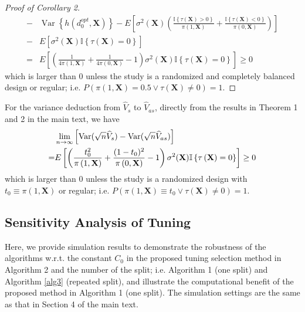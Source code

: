 \documentclass[11pt]{article}
\theoremstyle{referenceplain}
\theoremstyle{referencedefinition}
\theoremstyle{referenceremark}
\begin{document}
\begin{proof}[Proof of Corollary 2]
\begin{align*}
    -&\operatorname{Var}\left\{h\left(d_0^{o p t}, \mathbf{X}\right)\right\} - E\left[{\sigma^2(\mathbf{X})}\left(\frac{\mathbb{I}\left\{\tau\left(\mathbf{X}\right)>0\right\}}{\pi\left(1, \mathbf{X}\right)}+\frac{\mathbb{I}\left\{\tau\left(\mathbf{X}\right)<0\right\}}{\pi\left(0, \mathbf{X}\right)}\right)\right]\\
    -& E\left[{\sigma^2(\mathbf{X})} \mathbb{I}\left\{\tau\left(\mathbf{X}\right)=0\right\}\right]\\
   =&E\left[\left(\frac{1}{4 \pi\left(1, \mathbf{X}\right)}+\frac{1}{4\pi\left(0, \mathbf{X}\right)}-1\right){\sigma^2(\mathbf{X})} \mathbb{I}\left\{\tau\left(\mathbf{X}\right)=0\right\}\right]\ge 0
\end{align*}
which is larger than 0 unless the study is a randomized and completely balanced design or regular; i.e. $P(\pi\left(1, \mathbf{X}\right)=0.5\lor \tau(\mathbf{X})\neq 0)=1$. 
\end{proof}
For the variance deduction from $\widehat{V}_s$ to $\widehat{V}_{as}$, directly from the results in Theorem 1 and 2 in the main text,  we have 
\begin{align*}
  &\lim_{n\to\infty}\left[ \operatorname{Var}(\sqrt{n}\widehat{V}_{s}) - \operatorname{Var}(\sqrt{n}\widehat{V}_{as})\right]\notag\\
   =&E\left[\left(\frac{t_0^2}{\pi\left(1, \mathbf{X}\right)}+\frac{(1-t_0)^2}{\pi\left(0, \mathbf{X}\right)}-1\right){\sigma^2(\mathbf{X})} \mathbb{I}\left\{\tau\left(\mathbf{X}\right)=0\right\}\right]\ge 0
\end{align*}
which is larger than 0 unless the study is a randomized design with $t_0\equiv\pi(1,\mathbf{X})$ 
or regular; i.e. $P(\pi(1,\mathbf{X})\equiv t_0 \lor \tau(\mathbf{X})\neq 0)=1$. 

\subsection{Sensitivity Analysis of Tuning}
Here, we provide simulation results to demonstrate the robustness of the algorithms w.r.t. the constant ${C_0}$ in the proposed tuning selection method in Algorithm 2 and the number of the split; i.e. Algorithm 1 (one split) and Algorithm \ref{alg3} (repeated split), and illustrate the computational benefit of the proposed method in Algorithm 1 (one split). The simulation settings are the same as that in Section 4 of the main text. 
\end{document}
